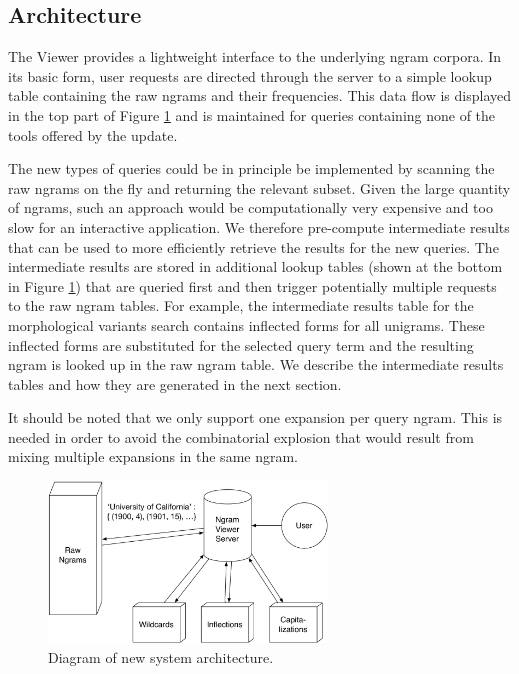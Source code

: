 \documentclass[11pt]{article}
\begin{document}
\subsection{Architecture}
The Viewer provides a lightweight interface to the underlying ngram corpora. In its basic form, user requests are directed through the server to a simple lookup table containing the raw ngrams and their frequencies. This data flow is displayed in the top part of Figure \ref{fig:architecture} and is maintained for queries containing none of the tools offered by the update.

The new types of queries could be in principle be implemented by scanning the raw ngrams on the fly and returning the relevant subset. Given the large quantity of ngrams, such an approach would be computationally very expensive and too slow for an interactive application. We therefore pre-compute intermediate results that can be used to more efficiently retrieve the results for the new queries. The intermediate results are stored in additional lookup tables (shown at the bottom in Figure \ref{fig:architecture}) that are queried first and then trigger potentially multiple requests to the raw ngram tables. For example, the intermediate results table for the morphological variants search contains inflected forms for all unigrams. These inflected forms are substituted for the selected query term and the resulting ngram is looked up in the raw ngram table. We describe the intermediate results tables and how they are generated in the next section.

It should be noted that we only support one expansion per query ngram. This is needed in order to avoid the combinatorial explosion that would result from mixing multiple expansions in the same ngram.



\begin{figure}
\includegraphics[width=20em,keepaspectratio=true]{system_architecture}
\caption{\label{fig:architecture}Diagram of new system architecture.}
\end{figure}
\end{document}
